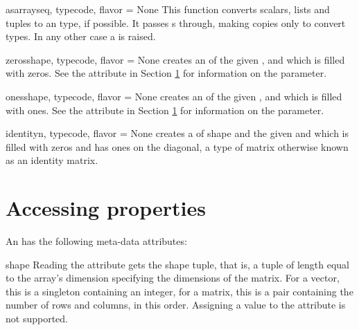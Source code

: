 \begin{funcdesc}{asarray}{seq, typecode, flavor = None}
  This function converts scalars, lists and tuples to an
   type, if possible. It passes s through,
  making copies only to convert types.  In any other case a
   is raised.
\end{funcdesc}

\begin{funcdesc}{zeros}{shape, typecode, flavor = None}
   creates an  of the given ,
   and  which is filled with zeros. See the
   attribute in Section \ref{sec:arrayproperties} for
  information on the  parameter.
\end{funcdesc}

\begin{funcdesc}{ones}{shape, typecode, flavor = None}
   creates an  of the given ,
   and  which is filled with ones. See the
   attribute in Section \ref{sec:arrayproperties} for
  information on the  parameter.
\end{funcdesc}

\begin{funcdesc}{identity}{n, typecode, flavor = None}
   creates a  of shape  and
  the given  and  which is filled with
  zeros and has ones on the diagonal, a type of matrix otherwise
  known as an identity matrix.
\end{funcdesc}

\section{Accessing  properties}

\label{sec:arrayproperties}
An  has the following meta-data attributes:

\begin{memberdesc}[Array]{shape}
  Reading the  attribute gets the shape tuple, that is,
  a tuple of length equal to the array's dimension specifying the
  dimensions of the matrix.  For a vector, this is a singleton
  containing an integer, for a matrix, this is a pair containing the
  number of rows and columns, in this order.  Assigning a value to the
   attribute is not supported.
\end{memberdesc}

